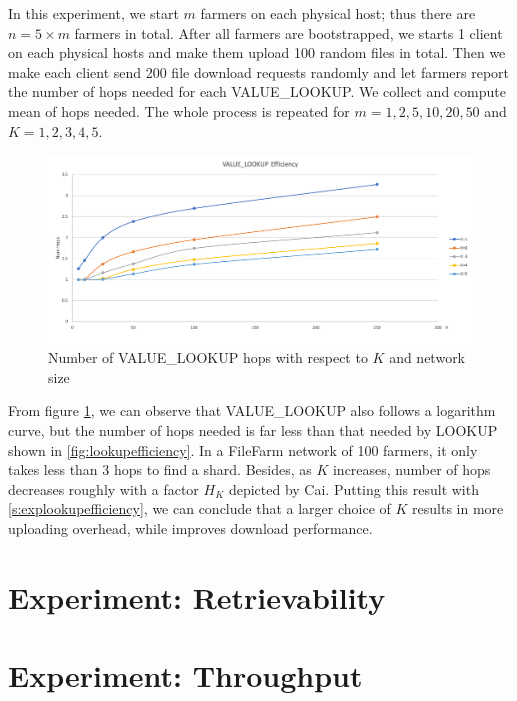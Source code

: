 In this experiment, we start $m$ farmers on each physical host; thus there are $n = 5 \times m$ farmers in total. After all farmers are bootstrapped, we starts 1 client on each physical hosts and make them upload 100 random files in total. Then we make each client send 200 file download requests randomly and let farmers report the number of hops needed for each VALUE\_LOOKUP. We collect and compute mean of hops needed. The whole process is repeated for $m=1,2,5,10,20,50$ and $K=1,2,3,4,5$.

\begin{figure}[hbt]
\centering
  \includegraphics[width=14cm]{charts/chart_value_lookup_efficiency.png}
  \caption{Number of VALUE\_LOOKUP hops with respect to $K$ and network size}
  \label{fig:valuelookupefficiency}
\end{figure}

\newpage

From figure \ref{fig:valuelookupefficiency}, we can observe that VALUE\_LOOKUP also follows a logarithm curve, but the number of hops needed is far less than that needed by LOOKUP shown in \ref{fig:lookupefficiency}. In a FileFarm network of 100 farmers, it only takes less than 3 hops to find a shard. Besides, as $K$ increases, number of hops decreases roughly with a factor $H_{K}$ depicted by Cai\cite{cai2013probabilistic}. Putting this result with \ref{s:explookupefficiency}, we can conclude that a larger choice of $K$ results in more uploading overhead, while improves download performance.

\section{Experiment: Retrievability}
\label{s:expretrievability}

\section{Experiment: Throughput}
\label{s:expthroughput}


